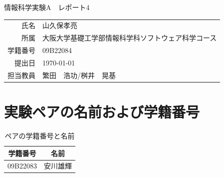 \documentclass[dvipdfmx]{jarticle}
\begin{document}
\begin{titlepage}
    \begin{center}
        {\huge 情報科学実験A　レポート4}
        \vspace{180pt}\\
        \begin{tabular}{rl}
            氏名 & 山久保孝亮\\
            所属 & 大阪大学基礎工学部情報科学科ソフトウェア科学コース\\
            学籍番号 & 09B22084\\
            提出日 & \today\\
            担当教員 & 繁田　浩功/桝井　晃基
        \end{tabular}
    \end{center}
\end{titlepage}
\section{実験ペアの名前および学籍番号}
\begin{table}[h]
    \centering
    \begin{tabular}{|c|c|}
        \hline
        学籍番号 & 名前\\\hline\hline
        09B22083 & 安川雄輝\\\hline
    \end{tabular}
    \caption{ペアの学籍番号と名前}
\end{table}
\end{document}
